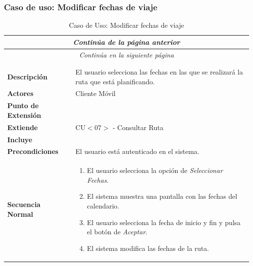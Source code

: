 \subsubsection*{Caso de uso: Modificar fechas de viaje}
\begin{longtable}{| p{4cm} | p{10cm} |}
\endfirsthead
\multicolumn{2}{c}{\textit{Continúa de la página anterior}}\\[12pt]
\hline
\endhead
\hline
\multicolumn{2}{c}{\textit{Continúa en la siguiente página}} \\
\endfoot
\hline
\caption{Caso de Uso: Modificar fechas de viaje}\label{fig:1}\\
\endlastfoot


\hline
\multicolumn{2}{|c|}{\textbf{CU$<$08$>$ - Modificar Fechas de Viaje}} \\

\hline
\textbf{Descripción} &
El usuario selecciona las fechas en las que se realizará la ruta que está planificando.\\

\hline
\textbf{Actores} &
Cliente Móvil\\


\hline
\textbf{Punto de Extensión} &
\\

\hline
\textbf{Extiende} &
CU$<$07$>$ - Consultar Ruta
\\

\hline
\textbf{Incluye} &
\\

\hline
\textbf{Precondiciones} &
El usuario está autenticado en el sistema.\\

\hline
\textbf{Secuencia Normal} &\mbox{}\par\vspace{-\baselineskip}
\begin{enumerate}[leftmargin=0.7cm, topsep=0.1cm]
\item El usuario selecciona la opción de \textit{Seleccionar Fechas}.
\item El sistema muestra una pantalla con las fechas del calendario.
\item El usuario selecciona la fecha de inicio y fin y pulsa el botón de \textit{Aceptar}.
\item El sistema modifica las fechas de la ruta.
\end{enumerate}\\


\end{longtable}
